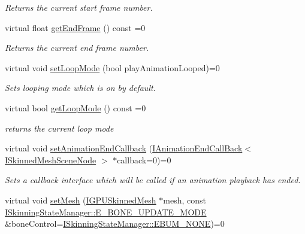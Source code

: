 \begin{DoxyCompactItemize}
\begin{DoxyCompactList}\small\item\em Returns the current start frame number. \end{DoxyCompactList}\item 
virtual float \hyperlink{classirr_1_1scene_1_1ISkinnedMeshSceneNode_a685112d6f355e49377fe00e359c468fa}{get\+End\+Frame} () const  =0\hypertarget{classirr_1_1scene_1_1ISkinnedMeshSceneNode_a685112d6f355e49377fe00e359c468fa}{}\label{classirr_1_1scene_1_1ISkinnedMeshSceneNode_a685112d6f355e49377fe00e359c468fa}

\begin{DoxyCompactList}\small\item\em Returns the current end frame number. \end{DoxyCompactList}\item 
virtual void \hyperlink{classirr_1_1scene_1_1ISkinnedMeshSceneNode_a5dd774c3fa110e8bada9d4e53266dc34}{set\+Loop\+Mode} (bool play\+Animation\+Looped)=0
\begin{DoxyCompactList}\small\item\em Sets looping mode which is on by default. \end{DoxyCompactList}\item 
virtual bool \hyperlink{classirr_1_1scene_1_1ISkinnedMeshSceneNode_a0c6f3c8a9d56cbe24acbdaa2bc0fa029}{get\+Loop\+Mode} () const  =0
\begin{DoxyCompactList}\small\item\em returns the current loop mode \end{DoxyCompactList}\item 
virtual void \hyperlink{classirr_1_1scene_1_1ISkinnedMeshSceneNode_aff45c2cd4eb26d8ca6142109ea3e351f}{set\+Animation\+End\+Callback} (\hyperlink{classirr_1_1scene_1_1IAnimationEndCallBack}{I\+Animation\+End\+Call\+Back}$<$ \hyperlink{classirr_1_1scene_1_1ISkinnedMeshSceneNode}{I\+Skinned\+Mesh\+Scene\+Node} $>$ $\ast$callback=0)=0
\begin{DoxyCompactList}\small\item\em Sets a callback interface which will be called if an animation playback has ended. \end{DoxyCompactList}\item 
virtual void \hyperlink{classirr_1_1scene_1_1ISkinnedMeshSceneNode_a60eea4931588604b2e7569a3c6a26cea}{set\+Mesh} (\hyperlink{classirr_1_1scene_1_1IGPUSkinnedMesh}{I\+G\+P\+U\+Skinned\+Mesh} $\ast$mesh, const \hyperlink{classirr_1_1scene_1_1ISkinningStateManager_a78f9d8d280dc029b3637bd3a48c0c3c6}{I\+Skinning\+State\+Manager\+::\+E\+\_\+\+B\+O\+N\+E\+\_\+\+U\+P\+D\+A\+T\+E\+\_\+\+M\+O\+DE} \&bone\+Control=\hyperlink{classirr_1_1scene_1_1ISkinningStateManager_a78f9d8d280dc029b3637bd3a48c0c3c6af91613b0a4c9ac338de93ff48a28885c}{I\+Skinning\+State\+Manager\+::\+E\+B\+U\+M\+\_\+\+N\+O\+NE})=0\hypertarget{classirr_1_1scene_1_1ISkinnedMeshSceneNode_a60eea4931588604b2e7569a3c6a26cea}{}\label{classirr_1_1scene_1_1ISkinnedMeshSceneNode_a60eea4931588604b2e7569a3c6a26cea}


\end{DoxyCompactItemize}
